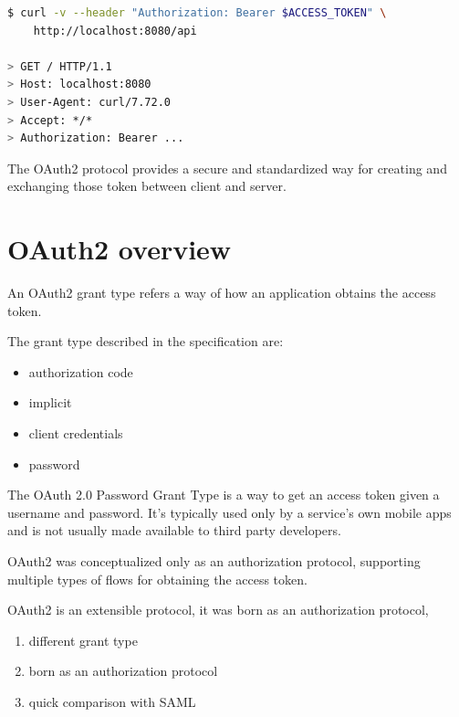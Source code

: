 \documentclass[11pt]{style}
\begin{document}
\begin{lstlisting}[language=bash]
$ curl -v --header "Authorization: Bearer $ACCESS_TOKEN" \
    http://localhost:8080/api

> GET / HTTP/1.1
> Host: localhost:8080
> User-Agent: curl/7.72.0
> Accept: */*
> Authorization: Bearer ...
\end{lstlisting}

The OAuth2 protocol provides a secure and standardized way for creating and exchanging those token between client and server.


\section{OAuth2 overview}
An OAuth2 grant type refers a way of how an application obtains the access
token.

The grant type described in the specification are:
\begin{itemize}
    \item authorization code
    \item implicit
    \item client credentials
    \item password
\end{itemize}

The OAuth 2.0 Password Grant Type is a way to get an access token given a
username and password. It’s typically used only by a service’s own mobile apps
and is not usually made available to third party developers.

OAuth2 was conceptualized only as an authorization protocol, supporting multiple
types of flows for obtaining the access token.

OAuth2 is an extensible protocol, it was born as an authorization protocol,
\begin{enumerate}
    \item different grant type
    \item born as an authorization protocol
    \item quick comparison with SAML
\end{enumerate}
\end{document}
